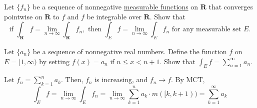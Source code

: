   \begin{exercise}[Royden 4.22]
    Let $\{f_n\}$ be a sequence of nonnegative \hyperref[def:measurable-function]{measurable functions} on $\mathbf{R}$ that converges pointwise on $\mathbf{R}$ to $f$ and $f$ be integrable over $\mathbf{R}$. Show that
    \begin{equation*}
      \text{if } \int_{\mathbf{R}} f = \lim_{n \to \infty} \int_{\mathbf{R}} f_n, \text{ then } \int_E f = \lim_{n \to \infty} \int_E f_n \text{ for any measurable set } E.
    \end{equation*}
  \end{exercise}

  \begin{exercise}[Royden 4.23]
    Let $\{a_n\}$ be a sequence of nonnegative real numbers. Define the function $f$ on $E = [1, \infty)$ by setting $f(x) = a_n$ if $n \leq x < n + 1$. Show that $\int_E f = \sum_{n=1}^{\infty} a_n$.
  \end{exercise}
  \begin{solution}
    Let $f_n = \sum_{k=1}^n a_k$. Then, $f_n$ is increasing, and $f_n \to f$. By MCT, 
    \begin{equation}
      \int_E f = \lim_{n \to \infty} \int_E f_n = \lim_{n \to \infty} \sum_{k=1}^n  a_k \cdot m([k, k +1)) = \sum_{k=1}^\infty a_k 
    \end{equation}
  \end{solution}


